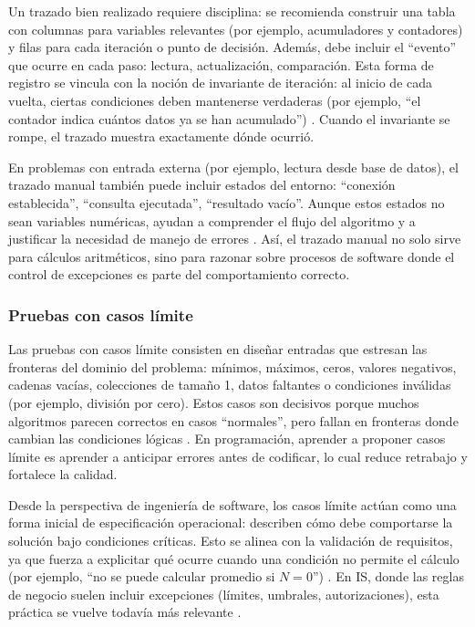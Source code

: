 \documentclass[12pt,twoside]{book}
\begin{document}
						Un trazado bien realizado requiere disciplina: se recomienda construir una tabla con columnas para variables relevantes (por ejemplo, acumuladores y contadores) y filas para cada iteración o punto de decisión. Además, debe incluir el “evento” que ocurre en cada paso: lectura, actualización, comparación. Esta forma de registro se vincula con la noción de invariante de iteración: al inicio de cada vuelta, ciertas condiciones deben mantenerse verdaderas (por ejemplo, “el contador indica cuántos datos ya se han acumulado”) \cite{Cormen2022Introduction}. Cuando el invariante se rompe, el trazado muestra exactamente dónde ocurrió.
						
						En problemas con entrada externa (por ejemplo, lectura desde base de datos), el trazado manual también puede incluir estados del entorno: “conexión establecida”, “consulta ejecutada”, “resultado vacío”. Aunque estos estados no sean variables numéricas, ayudan a comprender el flujo del algoritmo y a justificar la necesidad de manejo de errores \cite{Silberschatz2020Database,Elmasri2016Database}. Así, el trazado manual no solo sirve para cálculos aritméticos, sino para razonar sobre procesos de software donde el control de excepciones es parte del comportamiento correcto.
						
					\subsubsection{Pruebas con casos límite}
						\noindent
						Las pruebas con casos límite consisten en diseñar entradas que estresan las fronteras del dominio del problema: mínimos, máximos, ceros, valores negativos, cadenas vacías, colecciones de tamaño 1, datos faltantes o condiciones inválidas (por ejemplo, división por cero). Estos casos son decisivos porque muchos algoritmos parecen correctos en casos “normales”, pero fallan en fronteras donde cambian las condiciones lógicas \cite{Joyanes2007Fundamentos,Gaddis2022Starting}. En programación, aprender a proponer casos límite es aprender a anticipar errores antes de codificar, lo cual reduce retrabajo y fortalece la calidad.
						
						Desde la perspectiva de ingeniería de software, los casos límite actúan como una forma inicial de especificación operacional: describen cómo debe comportarse la solución bajo condiciones críticas. Esto se alinea con la validación de requisitos, ya que fuerza a explicitar qué ocurre cuando una condición no permite el cálculo (por ejemplo, “no se puede calcular promedio si $N=0$”) \cite{ISOIECIEEE2018Requirements,Pressman2019Software}. En IS, donde las reglas de negocio suelen incluir excepciones (límites, umbrales, autorizaciones), esta práctica se vuelve todavía más relevante \cite{Laudon2020Management,Kendall2014Systems}.
						
\end{document}
